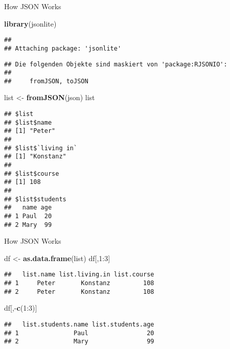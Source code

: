 \documentclass[ignorenonframetext,]{beamer}
\newenvironment{Shaded}{\begin{snugshade}}{\end{snugshade}}
\newcommand{\KeywordTok}[1]{\textcolor[rgb]{0.13,0.29,0.53}{\textbf{{#1}}}}
\newcommand{\DecValTok}[1]{\textcolor[rgb]{0.00,0.00,0.81}{{#1}}}
\newcommand{\StringTok}[1]{\textcolor[rgb]{0.31,0.60,0.02}{{#1}}}
\newcommand{\NormalTok}[1]{{#1}}
\begin{document}
\begin{frame}[fragile]{How JSON Works}

\begin{Shaded}
\begin{Highlighting}[]
\KeywordTok{library}\NormalTok{(jsonlite)}
\end{Highlighting}
\end{Shaded}

\begin{verbatim}
## 
## Attaching package: 'jsonlite'
\end{verbatim}

\begin{verbatim}
## Die folgenden Objekte sind maskiert von 'package:RJSONIO':
## 
##     fromJSON, toJSON
\end{verbatim}

\begin{Shaded}
\begin{Highlighting}[]
\NormalTok{list <-}\StringTok{ }\KeywordTok{fromJSON}\NormalTok{(json)}
\NormalTok{list}
\end{Highlighting}
\end{Shaded}

\begin{verbatim}
## $list
## $list$name
## [1] "Peter"
## 
## $list$`living in`
## [1] "Konstanz"
## 
## $list$course
## [1] 108
## 
## $list$students
##   name age
## 1 Paul  20
## 2 Mary  99
\end{verbatim}

\end{frame}

\begin{frame}[fragile]{How JSON Works}

\begin{Shaded}
\begin{Highlighting}[]
\NormalTok{df <-}\StringTok{ }\KeywordTok{as.data.frame}\NormalTok{(list)}
\NormalTok{df[,}\DecValTok{1}\NormalTok{:}\DecValTok{3}\NormalTok{]}
\end{Highlighting}
\end{Shaded}

\begin{verbatim}
##   list.name list.living.in list.course
## 1     Peter       Konstanz         108
## 2     Peter       Konstanz         108
\end{verbatim}

\begin{Shaded}
\begin{Highlighting}[]
\NormalTok{df[,-}\KeywordTok{c}\NormalTok{(}\DecValTok{1}\NormalTok{:}\DecValTok{3}\NormalTok{)]}
\end{Highlighting}
\end{Shaded}

\begin{verbatim}
##   list.students.name list.students.age
## 1               Paul                20
## 2               Mary                99
\end{verbatim}

\end{frame}
\end{document}
